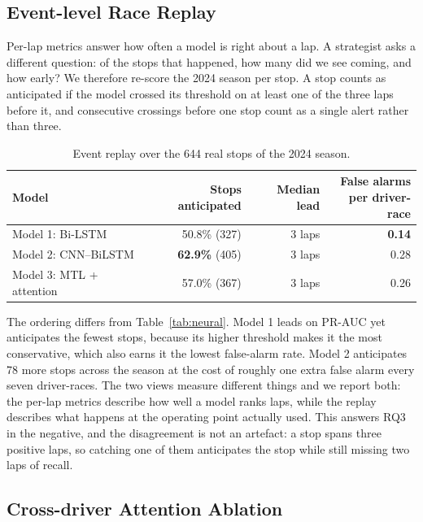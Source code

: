 \documentclass[conference]{IEEEtran}
\begin{document}
\subsection{Event-level Race Replay}

Per-lap metrics answer how often a model is right about a lap. A strategist asks a different question: of the stops that happened, how many did we see coming, and how early? We therefore re-score the 2024 season per stop. A stop counts as anticipated if the model crossed its threshold on at least one of the three laps before it, and consecutive crossings before one stop count as a single alert rather than three.

\begin{table}[t]
\centering
\caption{Event replay over the 644 real stops of the 2024 season.}
\label{tab:replay}
\small
\setlength{\tabcolsep}{4pt}
\begin{tabular}{lrrr}
\toprule
Model & Stops anticipated & Median lead & \shortstack{False alarms\\per driver-race} \\
\midrule
Model 1: Bi-LSTM         & 50.8\% (327) & 3 laps & \textbf{0.14} \\
Model 2: CNN--BiLSTM     & \textbf{62.9\%} (405) & 3 laps & 0.28 \\
Model 3: MTL + attention & 57.0\% (367) & 3 laps & 0.26 \\
\bottomrule
\end{tabular}
\end{table}

The ordering differs from Table~\ref{tab:neural}. Model 1 leads on PR-AUC yet anticipates the fewest stops, because its higher threshold makes it the most conservative, which also earns it the lowest false-alarm rate. Model 2 anticipates 78 more stops across the season at the cost of roughly one extra false alarm every seven driver-races. The two views measure different things and we report both: the per-lap metrics describe how well a model ranks laps, while the replay describes what happens at the operating point actually used. This answers RQ3 in the negative, and the disagreement is not an artefact: a stop spans three positive laps, so catching one of them anticipates the stop while still missing two laps of recall.

\subsection{Cross-driver Attention Ablation}
\end{document}
